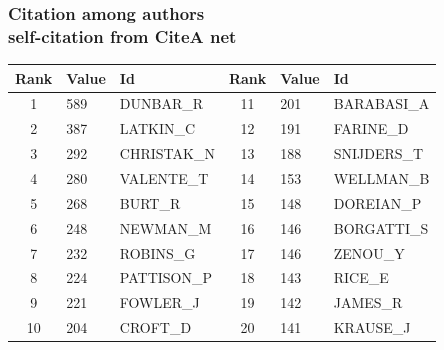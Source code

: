 \documentclass[hyperref={pdfstartview={FitBH -32768},
                         pdfpagemode=FullScreen,
                         plainpages=false,
                         colorlinks=true}
              ]{beamer}
\begin{document}
\begin{frame}[fragile]
\frametitle{Citation among authors \\ \normalsize self-citation from CiteA net}

\renewcommand{\arraystretch}{0.95}
\footnotesize
\begin{center}
\begin{tabular}{c|l|l|c|l|l|} 
     Rank  &     Value  & Id		 &    Rank  &     Value  & Id	   \\  \hline  
        1  &  589  & DUNBAR\_R	&    11  &  201  & BARABASI\_A	   \\
        2  &  387  & LATKIN\_C	&    12  &  191  & FARINE\_D	   \\
        3  &  292  & CHRISTAK\_N	&    13  &  188  & SNIJDERS\_T	   \\
        4  &  280  & VALENTE\_T	&    14  &  153  & WELLMAN\_B	   \\
        5  &  268  & BURT\_R	      	&    15  &  148  & DOREIAN\_P	   \\
        6  &  248  & NEWMAN\_M	&    16  &  146  & BORGATTI\_S	   \\
        7  &  232  & ROBINS\_G	&    17  &  146  & ZENOU\_Y	   \\    
        8  &  224  & PATTISON\_P	&    18  &  143  & RICE\_E	   \\    
        9  &  221  & FOWLER\_J	&    19  &  142  & JAMES\_R	   \\    
       10  &  204  & CROFT\_D	      	&   20   & 141   & KRAUSE\_J	    \\ \hline 
\end{tabular} 
\end{center}

\end{frame}

\end{document}

